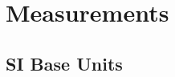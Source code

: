 \documentclass[../main]{subfiles}
\begin{document}
\section{Measurements}

	\subsection{SI Base Units}

	
\end{document}
